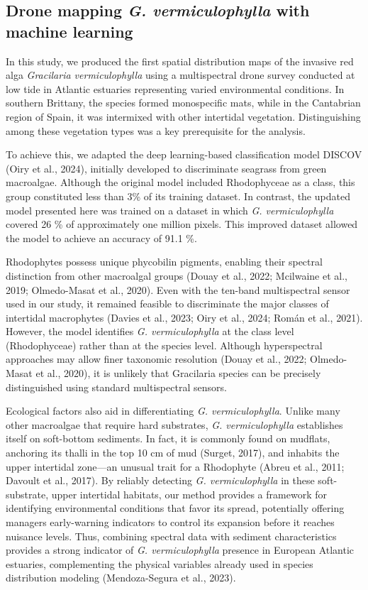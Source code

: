 \documentclass[
  letterpaper,
  DIV=11,
  numbers=noendperiod]{scrartcl}
\begin{document}
\subsection{\texorpdfstring{Drone mapping \emph{G. vermiculophylla} with
machine
learning}{Drone mapping G. vermiculophylla with machine learning}}\label{drone-mapping-g.-vermiculophylla-with-machine-learning}

In this study, we produced the first spatial distribution maps of the
invasive red alga \emph{Gracilaria vermiculophylla} using a
multispectral drone survey conducted at low tide in Atlantic estuaries
representing varied environmental conditions. In southern Brittany, the
species formed monospecific mats, while in the Cantabrian region of
Spain, it was intermixed with other intertidal vegetation.
Distinguishing among these vegetation types was a key prerequisite for
the analysis.

To achieve this, we adapted the deep learning-based classification model
DISCOV (Oiry et al., 2024), initially developed to discriminate seagrass
from green macroalgae. Although the original model included Rhodophyceae
as a class, this group constituted less than 3\% of its training
dataset. In contrast, the updated model presented here was trained on a
dataset in which \emph{G. vermiculophylla} covered 26 \% of
approximately one million pixels. This improved dataset allowed the
model to achieve an accuracy of 91.1 \%.

Rhodophytes possess unique phycobilin pigments, enabling their spectral
distinction from other macroalgal groups (Douay et al., 2022; Mcilwaine
et al., 2019; Olmedo-Masat et al., 2020). Even with the ten-band
multispectral sensor used in our study, it remained feasible to
discriminate the major classes of intertidal macrophytes (Davies et al.,
2023; Oiry et al., 2024; Román et al., 2021). However, the model
identifies \emph{G. vermiculophylla} at the class level (Rhodophyceae)
rather than at the species level. Although hyperspectral approaches may
allow finer taxonomic resolution (Douay et al., 2022; Olmedo-Masat et
al., 2020), it is unlikely that Gracilaria species can be precisely
distinguished using standard multispectral sensors.

Ecological factors also aid in differentiating \emph{G.
vermiculophylla}. Unlike many other macroalgae that require hard
substrates, \emph{G. vermiculophylla} establishes itself on soft-bottom
sediments. In fact, it is commonly found on mudflats, anchoring its
thalli in the top 10 cm of mud (Surget, 2017), and inhabits the upper
intertidal zone---an unusual trait for a Rhodophyte (Abreu et al., 2011;
Davoult et al., 2017). By reliably detecting \emph{G. vermiculophylla}
in these soft-substrate, upper intertidal habitats, our method provides
a framework for identifying environmental conditions that favor its
spread, potentially offering managers early-warning indicators to
control its expansion before it reaches nuisance levels. Thus, combining
spectral data with sediment characteristics provides a strong indicator
of \emph{G. vermiculophylla} presence in European Atlantic estuaries,
complementing the physical variables already used in species
distribution modeling (Mendoza-Segura et al., 2023).
\end{document}
